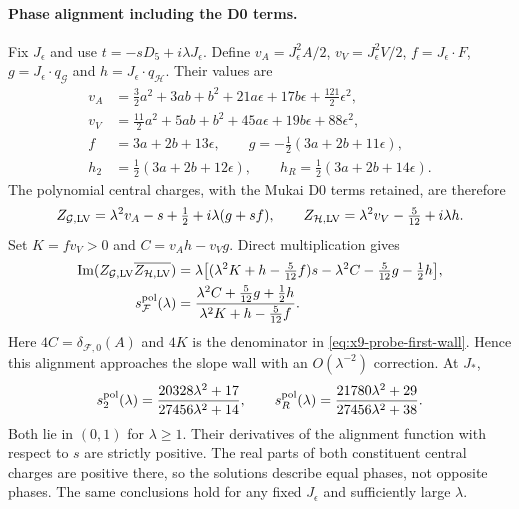 \paragraph{Phase alignment including the D0 terms.}
Fix $J_\epsilon$ and use $t=-sD_5+i\lambda J_\epsilon$.
Define $v_A=J_\epsilon^2A/2$, $v_V=J_\epsilon^2V/2$,
$f=J_\epsilon\cdot F$, $g=J_\epsilon\cdot q_{\mathcal G}$ and
$h=J_\epsilon\cdot q_{\mathcal H}$. Their values are
\begin{equation}
 \begin{aligned}
 v_A&=\tfrac32a^2+3ab+b^2+21a\epsilon+17b\epsilon
                         +\tfrac{121}{2}\epsilon^2,\\
 v_V&=\tfrac{11}{2}a^2+5ab+b^2+45a\epsilon+19b\epsilon
                         +88\epsilon^2,\\
 f&=3a+2b+13\epsilon,\qquad
 g=-\tfrac12(3a+2b+11\epsilon),\\
 h_2&=\tfrac12(3a+2b+12\epsilon),\qquad
 h_R=\tfrac12(3a+2b+14\epsilon).
 \end{aligned}
 \label{eq:x9-probe-phase-data}
\end{equation}
The polynomial central charges, with the Mukai D0 terms retained,
are therefore
\begin{equation}
 Z_{\mathcal G,\rm LV}=\lambda^2v_A-s+\tfrac12
                   +i\lambda(g+sf),\qquad
 Z_{\mathcal H,\rm LV}=\lambda^2v_V-\tfrac5{12}+i\lambda h.
 \label{eq:x9-probe-factor-central}
\end{equation}
Set $K=fv_V>0$ and $C=v_Ah-v_Vg$. Direct multiplication gives
\begin{equation}
 \begin{aligned}
 \operatorname{Im}(Z_{\mathcal G,\rm LV}
                     \overline{Z_{\mathcal H,\rm LV}})
 &=\lambda\big[(\lambda^2K+h-\tfrac5{12}f)s
                  -\lambda^2C-\tfrac5{12}g-\tfrac12h\big],\\
 s_{\mathcal F}^{\rm pol}(\lambda)
 &=\frac{\lambda^2C+\tfrac5{12}g+\tfrac12h}
         {\lambda^2K+h-\tfrac5{12}f}.
 \end{aligned}
 \label{eq:x9-probe-polynomial-wall}
\end{equation}
Here $4C=\delta_{\mathcal F,0}(A)$ and $4K$ is the denominator
in \eqref{eq:x9-probe-first-wall}. Hence this alignment approaches
the slope wall with an $O(\lambda^{-2})$ correction. At $J_*$,
\begin{equation}
 s_2^{\rm pol}(\lambda)=\frac{20328\lambda^2+17}{27456\lambda^2+14},
 \qquad
 s_R^{\rm pol}(\lambda)=\frac{21780\lambda^2+29}{27456\lambda^2+38}.
 \label{eq:x9-probe-finite-wall}
\end{equation}
Both lie in $(0,1)$ for $\lambda\geq1$. Their derivatives of the
alignment function with respect to $s$ are strictly positive.
The real parts of both constituent central charges are positive
there, so the solutions describe equal phases, not opposite phases.
The same conclusions hold for any fixed $J_\epsilon$ and sufficiently
large $\lambda$.

